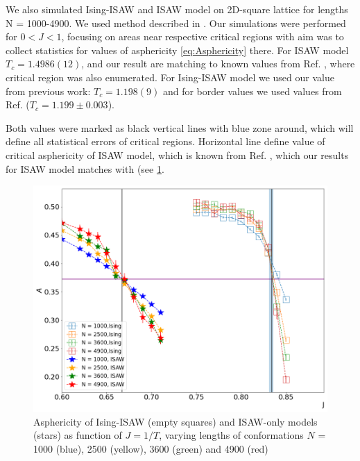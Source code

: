 \documentclass[aps,pre,amssymb,amsmath,twocolumn,floatfix]{revtex4-2}
\begin{document}

We also simulated Ising-ISAW and ISAW model on 2D-square lattice for lengths N = 1000-4900. We used method described in \cite{faizullina2021critical}. Our simulations were performed for $0 < J < 1$, focusing on areas near respective critical regions with aim was to collect statistics for values of asphericity \eqref{eq:Asphericity} there. For ISAW model $T_{c} = 1.4986(12)$, and our result are matching to known values from  Ref. \cite{Caracciolo2011}, where critical region was also enumerated. For Ising-ISAW model we used our value from previous work: $T_{c} = 1.198(9)$ \cite{faizullina2021critical} and for border values we used values from Ref.\cite{Foster2021} ($T_{c} = 1.199 \pm 0.003$). 

Both values were marked as black vertical lines with blue zone around, which will define all statistical errors of critical regions. Horizontal line define value of critical asphericity of ISAW model, which is known from Ref. \cite{Caracciolo_2011}, which our results for ISAW model matches with (see \cref{fig:Ising&ISAW_A_J}.

\begin{figure}[h!]
    \centering
    \includegraphics[width=\columnwidth]{Images/Ising_ISAW_A_J_Full.png}
    \caption{Asphericity of Ising-ISAW (empty squares) and ISAW-only models (stars) as function of $J=1/T$, varying lengths of conformations $N$ = 1000 (blue), 2500 (yellow), 3600 (green) and 4900 (red)}
    \label{fig:Ising&ISAW_A_J}
\end{figure}
\end{document}
